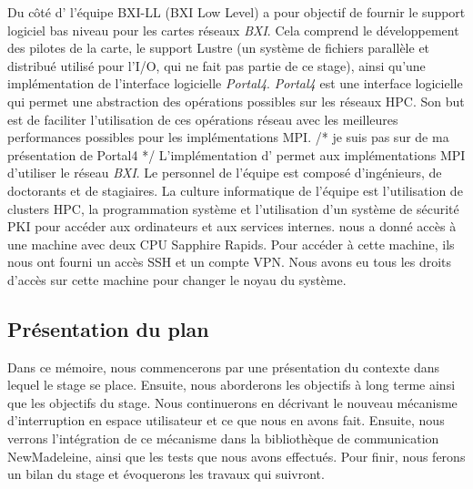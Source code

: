 Du côté d'\atos{} l'équipe BXI-LL (BXI Low Level) a pour objectif de fournir le support logiciel bas niveau pour les cartes réseaux \emph{BXI}.
Cela comprend le développement des pilotes de la carte, le support Lustre (un système de fichiers parallèle et distribué utilisé pour l'I/O, qui ne fait pas partie de ce stage), ainsi qu'une implémentation de l'interface logicielle \emph{Portal4}.
\emph{Portal4} est une interface logicielle qui permet une abstraction des opérations possibles sur les réseaux HPC.
Son but est de faciliter l'utilisation de ces opérations réseau avec les meilleures performances possibles pour les implémentations MPI. /* je suis pas sur de ma présentation de Portal4 */
L'implémentation d'\atos{} permet aux implémentations MPI d'utiliser le réseau \emph{BXI}.
Le personnel de l'équipe est composé d'ingénieurs, de doctorants et de stagiaires.
La culture informatique de l'équipe est l'utilisation de clusters HPC, la programmation système et l'utilisation d'un système de sécurité PKI pour accéder aux ordinateurs et aux services internes.
\atos{} nous a donné accès à une machine avec deux CPU \intel{} Sapphire Rapids.
Pour accéder à cette machine, ils nous ont fourni un accès SSH et un compte VPN.
Nous avons eu tous les droits d'accès sur cette machine pour changer le noyau du système.

\subsection{Présentation du plan}

Dans ce mémoire, nous commencerons par une présentation du contexte dans lequel le stage se place.
Ensuite, nous aborderons les objectifs à long terme ainsi que les objectifs du stage.
Nous continuerons en décrivant le nouveau mécanisme d'interruption en espace utilisateur et ce que nous en avons fait.
Ensuite, nous verrons l'intégration de ce mécanisme dans la bibliothèque de communication NewMadeleine, ainsi que les tests que nous avons effectués.
Pour finir, nous ferons un bilan du stage et évoquerons les travaux qui suivront.
